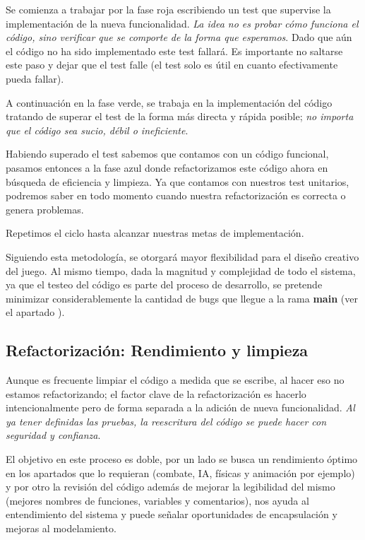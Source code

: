 Se comienza a trabajar por la fase roja escribiendo un test que supervise la implementación de la nueva funcionalidad. \emph{La idea no es probar cómo funciona el código, sino verificar que se comporte de la forma que esperamos}. Dado que aún el código no ha sido implementado este test fallará. Es importante no saltarse este paso y dejar que el test falle (el test solo es útil en cuanto efectivamente pueda fallar).

A continuación en la fase verde, se trabaja en la implementación del código tratando de superar el test de la forma más directa y rápida posible; \textit{no importa que el código sea sucio, débil o ineficiente}.

Habiendo superado el test sabemos que contamos con un código funcional, pasamos entonces a la fase azul donde refactorizamos este código ahora en búsqueda de eficiencia y limpieza. Ya que contamos con nuestros test unitarios, podremos saber en todo momento cuando nuestra refactorización es correcta o genera problemas.

Repetimos el ciclo hasta alcanzar nuestras metas de implementación.

Siguiendo esta metodología, se otorgará mayor flexibilidad para el diseño creativo del juego. Al mismo tiempo, dada la magnitud y complejidad de todo el sistema, ya que el testeo del código es parte del proceso de desarrollo, se pretende minimizar considerablemente la cantidad de bugs que llegue a la rama \textbf{main} (ver el apartado ).

\subsection{Refactorización: Rendimiento y limpieza}\label{principios:refactorizacion-rendimiento-limpieza}
Aunque es frecuente limpiar el código a medida que se escribe, al hacer eso no estamos refactorizando; el factor clave de la refactorización es hacerlo intencionalmente pero de forma separada a la adición de nueva funcionalidad. \emph{Al ya tener definidas las pruebas, la reescritura del código se puede hacer con seguridad y confianza}.

El objetivo en este proceso es doble, por un lado se busca un rendimiento óptimo en los apartados que lo requieran (combate, IA, físicas y animación por ejemplo) y por otro la revisión del código además de mejorar la legibilidad del mismo (mejores nombres de funciones, variables y comentarios), nos ayuda al entendimiento del sistema y puede señalar oportunidades de encapsulación y mejoras al modelamiento.

